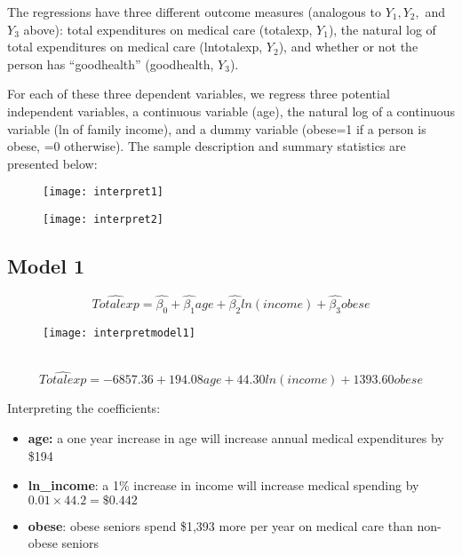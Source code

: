 \documentclass[12pt]{article}
\begin{document}
The regressions have three different outcome measures (analogous to $Y_1, Y_2,$ and $Y_3$ above): total expenditures on medical care (totalexp, $Y_1$), the natural log of total expenditures on medical care (lntotalexp, $Y_2$), and whether or not the person has ``goodhealth'' (goodhealth, $Y_3$). 

For each of these three dependent variables, we regress three potential independent variables, a continuous variable (age), the natural log of a continuous variable (ln of family income), and a dummy variable (obese=1 if a person is obese, =0 otherwise). The sample description and summary statistics are presented below: 

\begin{figure}[h!]
	\texttt{[image: interpret1]}	
\end{figure}

\begin{figure}[h!]
	\texttt{[image: interpret2]}	
\end{figure}

\clearpage 
\subsection*{Model 1}
\begin{equation*}
\widehat{Totalexp}=\hat{\beta_0}+\hat{\beta_1}age+\hat{\beta_2}ln(income)+\hat{\beta_3}obese	
\end{equation*}
\begin{figure}[h!]
	\texttt{[image: interpretmodel1]}	
\end{figure}\\
\begin{equation*}
\widehat{Totalexp}=-6857.36+194.08age+44.30ln(income)+1393.60obese	
\end{equation*}

Interpreting the coefficients: 
\begin{itemize}
	\item \textbf{age:} a one year increase in age will increase annual medical expenditures by \$194
	\item \textbf{ln\_income}: a 1\% increase in income will increase medical spending by $0.01\times44.2=\$0.442$
	\item \textbf{obese}: obese seniors spend \$1,393 more per year on medical care than non-obese seniors
\end{itemize}

\clearpage 
\end{document}
